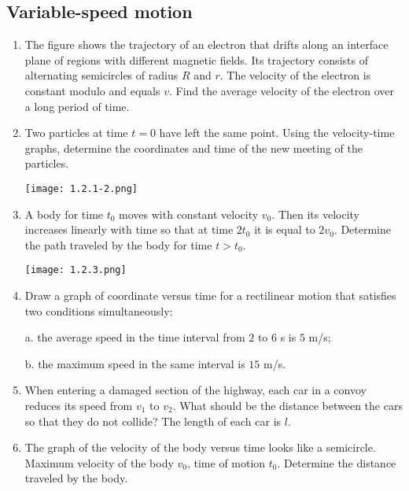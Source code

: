 \documentclass{article}
\begin{document}
\subsection{Variable-speed motion}

\begin{enumerate}[label=1.2.\arabic*]

\item The figure shows the trajectory of an electron that drifts along an interface plane of regions with different magnetic fields. Its trajectory consists of alternating semicircles of radius $R$ and $r$. The velocity of the electron is constant modulo and equals $v$. Find the average velocity of the electron over a long period of time.

\item Two particles at time $t = 0$ have left the same point. Using the velocity-time graphs, determine the coordinates and time of the new meeting of the particles.

\begin{center}
    \texttt{[image: 1.2.1-2.png]}
\end{center}

\item A body for time $t_0$ moves with constant velocity $v_0$. Then its velocity increases linearly with time so that at time $2 t_0$ it is equal to $2 v_0$. Determine the path traveled by the body for time $t > t_0$.

\begin{center}
    \texttt{[image: 1.2.3.png]}
\end{center}

\item Draw a graph of coordinate versus time for a rectilinear motion that satisfies two conditions simultaneously: 

a. the average speed in the time interval from $2$ to $6$ s is $5$ m/s; 

b. the maximum speed in the same interval is $15$ m/s.

\item When entering a damaged section of the highway, each car in a convoy reduces its speed from $v_1$ to $v_2$. What should be the distance between the cars so that they do not collide? The length of each car is $l$.

\item The graph of the velocity of the body versus time looks like a semicircle. Maximum velocity of the body $v_0$, time of motion $t_0$. Determine the distance traveled by the body.




\end{enumerate}
\end{document}
